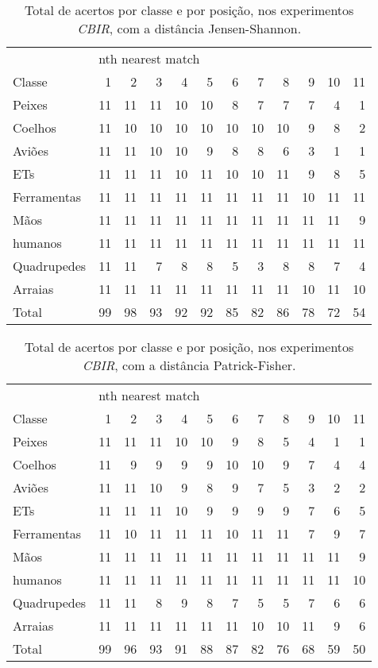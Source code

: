 \begin{table*}
\centering
\caption{\label{tab:Kimia} Total de acertos por classe e por posição, nos experimentos \emph{CBIR}, com a distância Jensen-Shannon.}
\begin{tabular}{l| r r r r r r r r r r r}
\hline
&\multicolumn{11}{l}{nth nearest match} \\
\cline{2-12}
Classe&1&2&3&4&5&6&7&8&9&10&11 \\
 \hline
Peixes&11&11&11&10&10&8&7&7&7&4&1\\
Coelhos&11&10&10&10&10&10&10&10&9&8&2\\ 
Aviões&11&11&10&10&9&8&8&6&3&1&1\\
ETs&11&11&11&10&11&10&10&11&9&8&5\\
Ferramentas&11&11&11&11&11&11&11&11&10&11& 11\\
Mãos&11&11&11&11&11&11&11&11&11&11&9\\
humanos&11&11&11&11&11&11&11&11&11&11&11\\
Quadrupedes&11&11&7&8&8&5&3&8&8&7&4\\
Arraias&11&11&11&11&11&11&11&11&10&11&10\\
\hline
Total&99&98&93&92&92&85&82&86&78&72&54\\
\hline
\end{tabular}
\end{table*}

\begin{table*}
\centering
\caption{\label{tab:Kimia} Total de acertos por classe e por posição, nos experimentos \emph{CBIR}, com a distância Patrick-Fisher.}
\begin{tabular}{l| r r r r r r r r r r r}
\hline
&\multicolumn{11}{l}{nth nearest match} \\
\cline{2-12}
Classe&1&2&3&4&5&6&7&8&9&10&11 \\
 \hline
Peixes&11&11&11&10&10&9&8&5&4&1&1\\
Coelhos&11&9&9&9&9&10&10&9&7&4&4\\ 
Aviões&11&11&10&9&8&9&7&5&3&2&2\\
ETs&11&11&11&10&9&9&9&9&7&6&5\\
Ferramentas&11&10&11&11&11&10&11&11&7&9  &7\\
Mãos&11&11&11&11&11&11&11&11&11&11&9\\
humanos&11&11&11&11&11&11&11&11&11&11&10\\
Quadrupedes&11&11&8&9&8&7&5&5&7&6&6\\
Arraias&11&11&11&11&11&11&10&10&11&9&6\\
\hline
Total&99&96&93&91&88&87&82&76&68&59&50\\
\hline
\end{tabular}
\end{table*}


